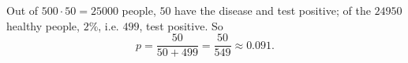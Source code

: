Out of $500\cdot50=25000$ people, $50$ have the disease and test positive; of the $24950$ healthy people, $2\%$, i.e. $499$, test positive. So
\[p=\dfrac{50}{50+499}=\boxed{\dfrac{50}{549}}\approx0.091.\]
